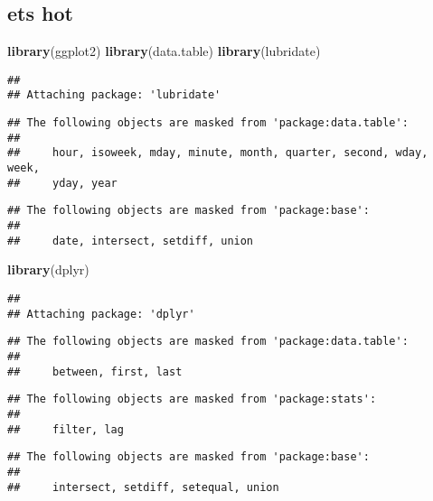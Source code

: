 \documentclass[
]{article}
\author{}
\date{\vspace{-2.5em}}
\newenvironment{Shaded}{\begin{snugshade}}{\end{snugshade}}
\newcommand{\FunctionTok}[1]{\textcolor[rgb]{0.13,0.29,0.53}{\textbf{#1}}}
\newcommand{\NormalTok}[1]{#1}
\begin{document}
\hypertarget{ets-hot}{%
\subsection{ets hot}\label{ets-hot}}

\begin{Shaded}
\begin{Highlighting}[]
\FunctionTok{library}\NormalTok{(ggplot2)}
\FunctionTok{library}\NormalTok{(data.table)}
\FunctionTok{library}\NormalTok{(lubridate)}
\end{Highlighting}
\end{Shaded}

\begin{verbatim}
## 
## Attaching package: 'lubridate'
\end{verbatim}

\begin{verbatim}
## The following objects are masked from 'package:data.table':
## 
##     hour, isoweek, mday, minute, month, quarter, second, wday, week,
##     yday, year
\end{verbatim}

\begin{verbatim}
## The following objects are masked from 'package:base':
## 
##     date, intersect, setdiff, union
\end{verbatim}

\begin{Shaded}
\begin{Highlighting}[]
\FunctionTok{library}\NormalTok{(dplyr)}
\end{Highlighting}
\end{Shaded}

\begin{verbatim}
## 
## Attaching package: 'dplyr'
\end{verbatim}

\begin{verbatim}
## The following objects are masked from 'package:data.table':
## 
##     between, first, last
\end{verbatim}

\begin{verbatim}
## The following objects are masked from 'package:stats':
## 
##     filter, lag
\end{verbatim}

\begin{verbatim}
## The following objects are masked from 'package:base':
## 
##     intersect, setdiff, setequal, union
\end{verbatim}
\end{document}
